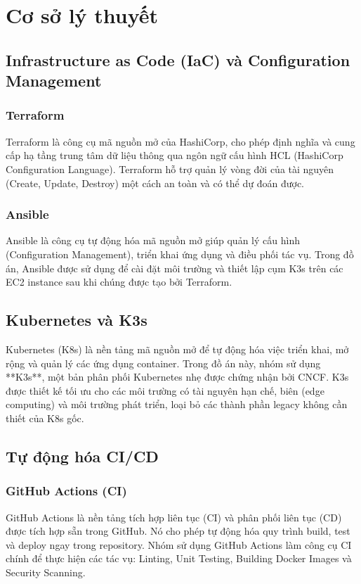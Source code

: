 \documentclass[12pt, a4paper]{article}
\begin{document}
\section{Cơ sở lý thuyết}

\subsection{Infrastructure as Code (IaC) và Configuration Management}
\subsubsection{Terraform}
Terraform là công cụ mã nguồn mở của HashiCorp, cho phép định nghĩa và cung cấp hạ tầng trung tâm dữ liệu thông qua ngôn ngữ cấu hình HCL (HashiCorp Configuration Language). Terraform hỗ trợ quản lý vòng đời của tài nguyên (Create, Update, Destroy) một cách an toàn và có thể dự đoán được.

\subsubsection{Ansible}
Ansible là công cụ tự động hóa mã nguồn mở giúp quản lý cấu hình (Configuration Management), triển khai ứng dụng và điều phối tác vụ. Trong đồ án, Ansible được sử dụng để cài đặt môi trường và thiết lập cụm K3s trên các EC2 instance sau khi chúng được tạo bởi Terraform.

\subsection{Kubernetes và K3s}
Kubernetes (K8s) là nền tảng mã nguồn mở để tự động hóa việc triển khai, mở rộng và quản lý các ứng dụng container. Trong đồ án này, nhóm sử dụng **K3s**, một bản phân phối Kubernetes nhẹ được chứng nhận bởi CNCF. K3s được thiết kế tối ưu cho các môi trường có tài nguyên hạn chế, biên (edge computing) và môi trường phát triển, loại bỏ các thành phần legacy không cần thiết của K8s gốc.

\subsection{Tự động hóa CI/CD}
\subsubsection{GitHub Actions (CI)}
GitHub Actions là nền tảng tích hợp liên tục (CI) và phân phối liên tục (CD) được tích hợp sẵn trong GitHub. Nó cho phép tự động hóa quy trình build, test và deploy ngay trong repository. Nhóm sử dụng GitHub Actions làm công cụ CI chính để thực hiện các tác vụ: Linting, Unit Testing, Building Docker Images và Security Scanning.
\end{document}
